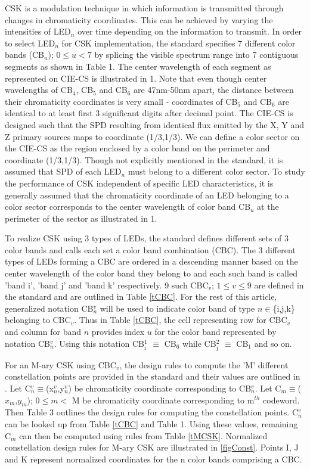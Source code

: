 \documentclass[10pt,letterpaper]{article}
\begin{document}
CSK is a modulation technique in which information is transmitted
through changes in chromaticity coordinates. This can be achieved by
varying the intensities of LED$_{n}$ over time depending on the
information to transmit. In order to select LED$_{n}$ for CSK implementation, the
standard specifies 7 different color bands
(CB$_{u}$); $0\leq u < 7$ by splicing the visible spectrum range into 7 contiguous
segments as shown in Table 1. The center wavelength of each segment as represented 
on CIE-CS is illustrated in \figurename 1. {\color{red}Note that even though center wavelengths of CB$_{4}$, CB$_{5}$ and CB$_{6}$ are 47nm-50nm apart, the distance between their chromaticity coordinates is very small - coordinates of CB$_{5}$ and CB$_{6}$ are identical to at least first 3 significant digits after decimal point. The CIE-CS is designed such that the SPD resulting from identical flux emitted by the X, Y and Z primary sources maps to coordinate (1/3,1/3). We can define a color sector on the CIE-CS as the region enclosed by a color band on the perimeter and coordinate (1/3,1/3).} Though not explicitly mentioned in the standard, it is assumed that SPD of
each LED$_{n}$ must belong to a different color sector. To study the performance of CSK independent of
specific LED characteristics, it is generally assumed that the
chromaticity coordinate of an LED belonging to a color sector corresponds
to the center wavelength of color band CB$_{u}$ at the perimeter of the sector as illustrated in \figurename 1.

To realize CSK using 3 types of LEDs, the standard defines different
sets of 3 color bands and calls each set a color band combination
(CBC). The 3 different types of LEDs forming a CBC are ordered in a
descending manner based on the center wavelength of the color band
they belong to and each such band is called 'band i', 'band j' and
'band k' respectively. 9 such CBC$_{v}$; $1\leq v\leq 9$ are defined
in the standard and are outlined in Table \ref{tCBC}. For the rest of
this article, generalized notation CB$^{v}_{n}$ will be used to
indicate color band of type $n\in$\{i,j,k\} belonging to CBC$_{v}$. {\color{red}Thus in Table \ref{tCBC}, the cell representing row for CBC$_{v}$ and column for band $n$ provides index $u$ for the color band represented by notation CB$^{v}_{n}$.} 
Using this notation CB$^{1}_{\text{i}}$ $\equiv$ CB$_{6}$ while CB$^{2}_{\text{j}}$ $\equiv$ CB$_{1}$ and so on.

For an M-ary CSK using CBC$_{v}$, the design rules to compute the 'M' different constellation points are provided in the standard and their values are outlined in \cite{cskxy}. Let C$^{v}_{n}\equiv$(x$^{v}_{n}$,y$^{v}_{n}$) be chromaticity coordinate corresponding to CB$^{v}_{n}$. Let C$_{m}\equiv$($x_{m}$,$y_{m}$); $0\leq m <$ M be chromaticity coordinate corresponding to m$^{th}$ codeword. Then Table 3 outlines the design rules for computing the constellation points. C$^{v}_{n}$ can be looked up from Table \ref{tCBC} and Table 1. Using these values, remaining C$_{m}$ can then be computed using rules from Table \ref{tMCSK}. Normalized constellation design rules for M-ary CSK are illustrated in \figurename\ref{figConst}. Points I, J and K represent normalized coordinates for the n color bands comprising a CBC. 
\end{document}
